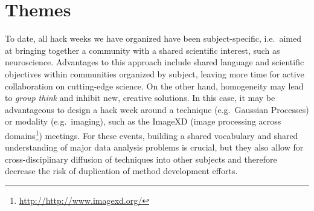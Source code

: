 \section*{Themes}

To date, all hack weeks we have organized have been subject-specific, i.e.\ aimed at bringing together a community with a shared scientific interest, such as neuroscience.
Advantages to this approach include shared language and scientific objectives within communities organized by subject, leaving more time for active collaboration on cutting-edge science.
On the other hand, homogeneity may lead to \textit{group think} and inhibit new, creative solutions.
In this case, it may be advantageous to design a hack week around a technique (e.g.\ Gaussian Processes) or modality (e.g.\ imaging), such as the ImageXD (image processing across domains\footnote{\url{http://http://www.imagexd.org/}}) meetings.
For these events, building a shared vocabulary and shared understanding of major data analysis problems is crucial, but they also allow for cross-disciplinary diffusion of techniques into other subjects and therefore decrease the risk of duplication of method development efforts.